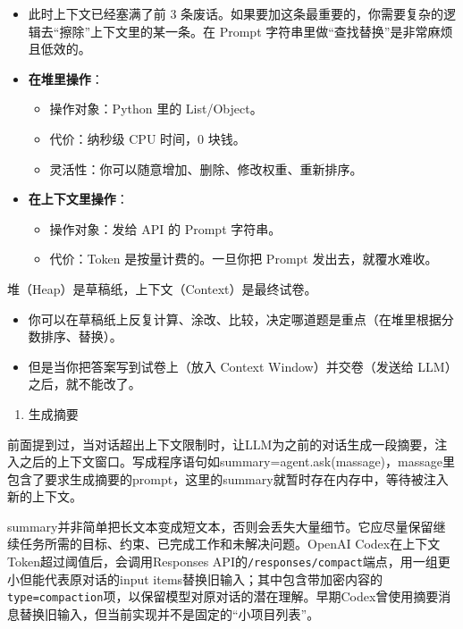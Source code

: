 \begin{itemize}
\item
  此时上下文已经塞满了前 3 条废话。如果要加这条最重要的，你需要复杂的逻辑去``擦除''上下文里的某一条。在 Prompt 字符串里做``查找替换''是非常麻烦且低效的。
\item
{}
  \textbf{在堆里操作}：

  \begin{itemize}
  \tightlist
  \item
    操作对象：Python 里的 List/Object。
  \item
    代价：纳秒级 CPU 时间，0 块钱。
  \item
    灵活性：你可以随意增加、删除、修改权重、重新排序。
  \end{itemize}
\item
{}
  \textbf{在上下文里操作}：

  \begin{itemize}
  \tightlist
  \item
    操作对象：发给 API 的 Prompt 字符串。
  \item
    代价：Token 是按量计费的。一旦你把 Prompt 发出去，就覆水难收。
  \end{itemize}
\end{itemize}

堆（Heap）是草稿纸，上下文（Context）是最终试卷。

\begin{itemize}
\tightlist
\item
  你可以在草稿纸上反复计算、涂改、比较，决定哪道题是重点（在堆里根据分数排序、替换）。
\item
  但是当你把答案写到试卷上（放入 Context Window）并交卷（发送给 LLM）之后，就不能改了。
\end{itemize}

\begin{enumerate}
\def\labelenumi{\arabic{enumi}.}
\setcounter{enumi}{1}
\tightlist
\item
  生成摘要
\end{enumerate}

前面提到过，当对话超出上下文限制时，让LLM为之前的对话生成一段摘要，注入之后的上下文窗口。写成程序语句如summary=agent.ask(massage)，massage里包含了要求生成摘要的prompt，这里的summary就暂时存在内存中，等待被注入新的上下文。

summary并非简单把长文本变成短文本，否则会丢失大量细节。它应尽量保留继续任务所需的目标、约束、已完成工作和未解决问题。OpenAI Codex在上下文Token超过阈值后，会调用Responses API的\texttt{/responses/compact}端点，用一组更小但能代表原对话的input items替换旧输入；其中包含带加密内容的\texttt{type=compaction}项，以保留模型对原对话的潜在理解。早期Codex曾使用摘要消息替换旧输入，但当前实现并不是固定的``小项目列表''。

